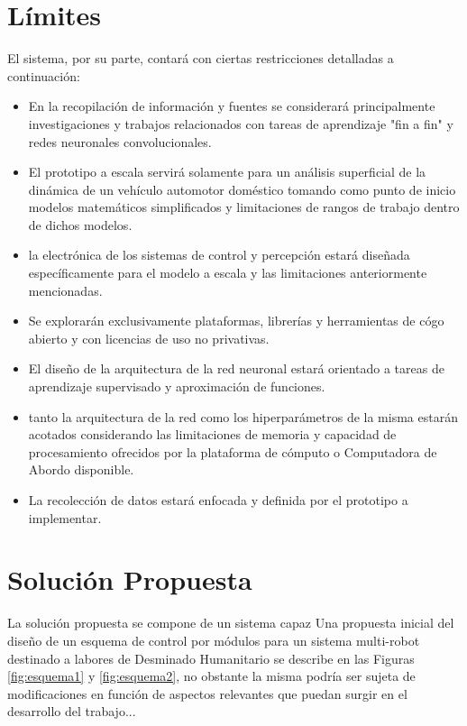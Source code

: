 \documentclass[12pt,letterpaper]{article}
\begin{document}
\section{Límites}
El sistema, por su parte, contará con ciertas restricciones detalladas a 
continuación:
\begin{itemize}
    \item En la recopilación de información y fuentes se 
    considerará principalmente investigaciones y trabajos relacionados
    con tareas de aprendizaje "fin a fin" y redes neuronales convolucionales.
    \item El prototipo a escala servirá solamente para un análisis superficial 
    de la dinámica de un vehículo automotor doméstico tomando como punto 
    de inicio modelos matemáticos simplificados y limitaciones de rangos de trabajo dentro 
    de dichos modelos.
    \item la electrónica de los sistemas de control y percepción estará 
    diseñada específicamente para el modelo a escala y las limitaciones anteriormente
    mencionadas.
    \item Se explorarán exclusivamente plataformas, librerías y herramientas
    de cógo abierto y con licencias de uso no privativas.
    \item El diseño de la arquitectura de la red neuronal estará orientado a 
    tareas de aprendizaje supervisado y aproximación de funciones.
    \item tanto la arquitectura de la red como los hiperparámetros de 
    la misma estarán acotados considerando las limitaciones de memoria y capacidad 
    de procesamiento ofrecidos por la plataforma de cómputo o Computadora
    de Abordo disponible.
    \item La recolección de datos estará enfocada y definida por el prototipo
    a implementar.
\end{itemize}
\section{Solución Propuesta}

La solución propuesta se compone de un sistema capaz 
Una propuesta inicial del diseño de un esquema de control por módulos para un sistema multi-robot destinado 
a labores de Desminado Humanitario se describe en las Figuras \ref{fig:esquema1} y \ref{fig:esquema2}, no obstante 
la misma podría ser sujeta de modificaciones en función de aspectos relevantes que puedan surgir 
en el desarrollo del trabajo...
\end{document}
